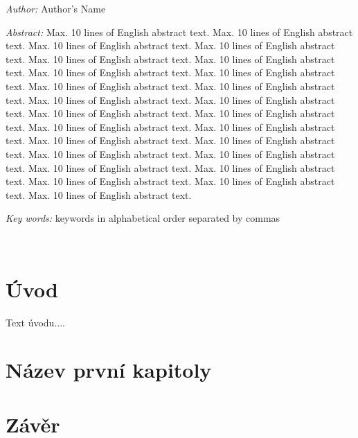 \documentclass[a4paper,11pt]{book}
\begin{document}
\bigskip{}


\noindent \emph{Author:} Author's Name

\bigskip{}


\noindent \emph{Abstract:} Max. 10 lines of English abstract text.
Max. 10 lines of English abstract text. Max. 10 lines of English abstract
text. Max. 10 lines of English abstract text. Max. 10 lines of English
abstract text. Max. 10 lines of English abstract text. Max. 10 lines
of English abstract text. Max. 10 lines of English abstract text.
Max. 10 lines of English abstract text. Max. 10 lines of English abstract
text. Max. 10 lines of English abstract text. Max. 10 lines of English
abstract text. Max. 10 lines of English abstract text. Max. 10 lines
of English abstract text. Max. 10 lines of English abstract text.
Max. 10 lines of English abstract text. Max. 10 lines of English abstract
text. Max. 10 lines of English abstract text. Max. 10 lines of English
abstract text. Max. 10 lines of English abstract text. Max. 10 lines
of English abstract text. Max. 10 lines of English abstract text.
Max. 10 lines of English abstract text. Max. 10 lines of English abstract
text. Max. 10 lines of English abstract text.

\bigskip{}


\noindent \emph{Key words:} keywords in alphabetical order separated
by commas

\newpage{}

~\newpage{}

\pagestyle{plain}

\tableofcontents{}

\newpage{}


\chapter*{Úvod}


Text úvodu....


\chapter{Název první kapitoly}

\pagestyle{headings}


\chapter*{Závěr}

\pagestyle{plain}
\end{document}

